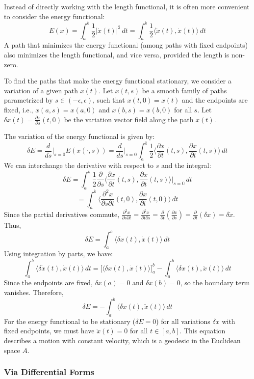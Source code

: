 Instead of directly working with the length functional, it is often more convenient to consider the energy functional:
\[ E(x) = \int_a^b \frac{1}{2} |\dot{x}(t)|^2 \, dt = \int_a^b \frac{1}{2} \langle \dot{x}(t), \dot{x}(t) \rangle \, dt \]
A path that minimizes the energy functional (among paths with fixed endpoints) also minimizes the length functional, and vice versa, provided the length is non-zero.

To find the paths that make the energy functional stationary, we consider a variation of a given path $x(t)$. Let $x(t, s)$ be a smooth family of paths parametrized by $s \in (-\epsilon, \epsilon)$, such that $x(t, 0) = x(t)$ and the endpoints are fixed, i.e., $x(a, s) = x(a, 0)$ and $x(b, s) = x(b, 0)$ for all $s$. Let $\delta x(t) = \frac{\partial x}{\partial s}(t, 0)$ be the variation vector field along the path $x(t)$.

The variation of the energy functional is given by:
\[ \delta E = \frac{d}{ds} \Big|_{s=0} E(x(\cdot, s)) = \frac{d}{ds} \Big|_{s=0} \int_a^b \frac{1}{2} \langle \frac{\partial x}{\partial t}(t, s), \frac{\partial x}{\partial t}(t, s) \rangle \, dt \]
We can interchange the derivative with respect to $s$ and the integral:
\[ \delta E = \int_a^b \frac{1}{2} \frac{\partial}{\partial s} \langle \frac{\partial x}{\partial t}(t, s), \frac{\partial x}{\partial t}(t, s) \rangle \Big|_{s=0} \, dt \]
\[ = \int_a^b \langle \frac{\partial^2 x}{\partial s \partial t}(t, 0), \frac{\partial x}{\partial t}(t, 0) \rangle \, dt \]
Since the partial derivatives commute, $\frac{\partial^2 x}{\partial s \partial t} = \frac{\partial^2 x}{\partial t \partial s} = \frac{\partial}{\partial t} (\frac{\partial x}{\partial s}) = \frac{\partial}{\partial t} (\delta x) = \delta \dot{x}$. Thus,
\[ \delta E = \int_a^b \langle \delta \dot{x}(t), \dot{x}(t) \rangle \, dt \]
Using integration by parts, we have:
\[ \int_a^b \langle \delta \dot{x}(t), \dot{x}(t) \rangle \, dt = \Big[ \langle \delta x(t), \dot{x}(t) \rangle \Big]_a^b - \int_a^b \langle \delta x(t), \ddot{x}(t) \rangle \, dt \]
Since the endpoints are fixed, $\delta x(a) = 0$ and $\delta x(b) = 0$, so the boundary term vanishes. Therefore,
\[ \delta E = - \int_a^b \langle \delta x(t), \ddot{x}(t) \rangle \, dt \]
For the energy functional to be stationary ($\delta E = 0$) for all variations $\delta x$ with fixed endpoints, we must have $\ddot{x}(t) = 0$ for all $t \in [a, b]$. This equation describes a motion with constant velocity, which is a geodesic in the Euclidean space $A$.

\subsubsection{Via Differential Forms}

